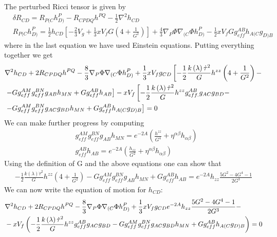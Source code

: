 \documentclass[10 pt]{article}
\begin{document}
The perturbed Ricci tensor is given by
\begin{align}
&\delta R_{CD} = R_{P(C}h_{D)}^P - R_{CPDQ}h^{PQ} - \frac{1}{2} \nabla^2 h_{CD} \\
&R_{P(C}h_{D)}^P = \frac{1}{2} h_{CD} \left[ - \frac{2}{3} V_g + \frac{1}{3} x V_f G \left( 4 + \frac{1}{G^2}\right) \right] + \frac{4}{3} \nabla_P \Phi \nabla_{(C}\Phi h_{D)}^P - \frac{1}{2} x V_f G g_{eff}^{AB} h_{A(C}g_{D)B}
\end{align}
where in the last equation we have used Einstein equations.
Putting everything together we get
\begin{align}
&\nabla^2 h_{CD} + 2 R_{CPDQ} h^{PQ} - \frac{8}{3} \nabla_P \Phi \nabla_{(C} \Phi h_{D)}^P + \frac{1}{3} x V_f g_{CD} \left[ - \frac{1}{2} \frac{k\left(\lambda\right) {\dot{\tau}}^2}{G} h^{zz} \left( 4 + \frac{1}{G^2} \right) - \right.  \notag \\
&\left. - G g_{eff}^{AM} g_{eff}^{BN} g_{AB} h_{MN} + G g_{eff}^{AB} h_{AB}  \right] - x V_f \left[ - \frac{1}{2} \frac{k\left(\lambda\right) {\dot{\tau}}^2}{G} h^{zz} g_{eff.}^{AB} g_{AC} g_{BD}  - \right. \notag \\
& \left. - G g_{eff}^{AM} g_{eff}^{BN} g_{AC} g_{BD} h_{MN} + G g_{eff}^{AB} h_{A(C} g_{D)B} \right] = 0
\end{align}
We can make further progress by computing
\begin{align}
&g_{eff}^{AM} g_{eff}^{BN} g_{AB} h_{MN}  = e^{-2A} \left( \frac{h^{zz}}{G^4} + \eta^{\alpha \beta} h_{\alpha \beta} \right) \\
&g_{eff}^{AB}h_{AB} = e^{-2A} \left( \frac{h_{zz}}{G^2} + \eta^{\alpha \beta} h_{\alpha \beta} \right)
\end{align}
Using the definition of G and the above equations one can show that
\begin{align}
- \frac{1}{2} \frac{k\left(\lambda\right) {\dot{\tau}}^2}{G} h^{zz} \left( 4 + \frac{1}{G^2} \right) - G g_{eff}^{AM} g_{eff}^{BN} g_{AB} h_{MN} + G g_{eff}^{AB} h_{AB} = e^{-2A} h_{zz} \frac{5 G^2 - 4 G^4 - 1}{2 G^3}
\end{align}
We can now write the equation of motion for $h_{CD}$:
\begin{align}
&\nabla^2 h_{CD} + 2 R_{CPDQ}h^{PQ} - \frac{8}{3} \nabla_P \Phi \nabla_{(C}\Phi h_{D)}^P + \frac{1}{3} x V_f g_{CD} e^{-2A} h_{zz} \frac{5 G^2 - 4 G^4 -1}{2G^3} - \notag \\
& - x V_f \left( - \frac{1}{2} \frac{k\left(\lambda\right) {\dot{\tau}}^2}{G} h^{zz} g_{eff}^{AB}g_{AC} g_{BD} - G g_{eff}^{AM} g_{eff}^{BN} g_{AC} g_{BD} h_{MN} + G g_{eff}^{AB} h_{A(C}g_{D)B} \right) = 0
\end{align}
\end{document}
